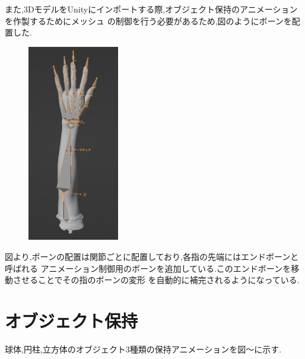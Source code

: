 \documentclass{ltjsreport}
\begin{document}
		また,3DモデルをUnityにインポートする際,オブジェクト保持のアニメーションを作製するためにメッシュ
		の制御を行う必要があるため,図のようにボーンを配置した.
		\begin{figure}[H]
		\centering
		\includegraphics[width = 4cm]{../figs/meshbone.png}
		\caption{}
		\label{}
		\end{figure}

		図より,ボーンの配置は関節ごとに配置しており,各指の先端にはエンドボーンと呼ばれる
		アニメーション制御用のボーンを追加している.このエンドボーンを移動させることでその指のボーンの変形
		を自動的に補完されるようになっている.

	\section{オブジェクト保持}

		球体,円柱,立方体のオブジェクト3種類の保持アニメーションを図〜に示す.
\end{document}

